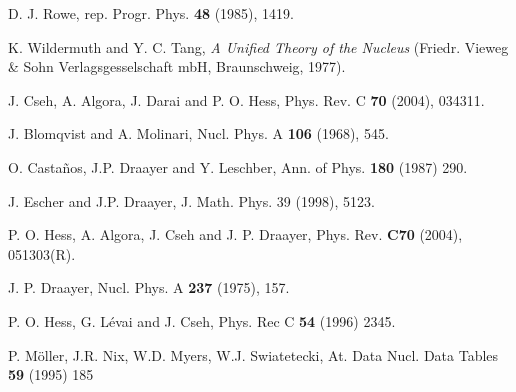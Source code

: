 \documentclass[12pt]{article}
\begin{document}
\begin{thebibliography}{99}
 D. J. Rowe, rep. Progr. Phys. {\bf 48} (1985), 1419.

  K. Wildermuth and Y. C. Tang, \emph{A Unified Theory of
the Nucleus} (Friedr. Vieweg \& Sohn Verlagsgesselschaft mbH, Braunschweig,
1977).

 J. Cseh, A. Algora, J. Darai and 
P. O. Hess, Phys. Rev. C {\bf 70} (2004), 034311.

 J. Blomqvist and A. Molinari, Nucl. Phys. A \textbf{106} (1968), 545.

 O. Casta\~nos, J.P. Draayer and Y. Leschber, Ann. of Phys. {\bf 180} (1987) 290.

 J. Escher and J.P. Draayer, J. Math. Phys. 39 
(1998), 5123.

 P. O. Hess, A. Algora, J. Cseh and J. P. Draayer,  Phys. Rev. {\bf C70} (2004), 051303(R).

 J. P. Draayer, Nucl. Phys. 
A {\bf 237} (1975), 157.

 P. O. Hess, G. L\'evai and J. Cseh, Phys. Rec C {\bf 54} (1996) 2345.

 P. M\"oller, J.R. Nix, W.D. Myers, W.J. Swiatetecki, At. Data Nucl. Data Tables 
{\bf 59} (1995) 185

\end{thebibliography}
\end{document}

